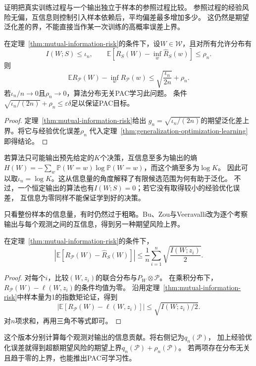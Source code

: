 证明把真实训练过程与一个输出独立于样本的参照过程比较。
参照过程的经验风险无偏，互信息则控制引入样本依赖后，平均偏差最多增加多少。
这仍然是期望泛化差的界，不能直接当作某一次训练的高概率误差上界。

\begin{theorem}[互信息稳定性与可学习性]
\label{thm:mutual-information-learning}
在定理~\ref{thm:mutual-information-risk}的条件下，设$W\in\mathcal W$，且对所有允许分布有
\[
 I(W;S)\leq\iota_n,\qquad
 \mathbb E[\hat R_S(W)-\inf_w\hat R_S(w)]\leq\rho_n.
\]
则
\[
 \mathbb E R_{\mathcal P}(W)-\inf_wR_{\mathcal P}(w)
 \leq\sqrt{\frac{\iota_n}{2n}}+\rho_n.
\]
若$\iota_n/n\to0$且$\rho_n\to0$，算法分布无关PAC学习此问题。
条件$\sqrt{\iota_n/(2n)}+\rho_n\leq\varepsilon\delta$足以保证PAC目标。
\end{theorem}
\begin{proof}
定理~\ref{thm:mutual-information-risk}给出
$g_n=\sqrt{\iota_n/(2n)}$的期望泛化差上界。将它与经验优化误差$\rho_n$
代入定理~\ref{thm:generalization-optimization-learning}即得结论。
\end{proof}

若算法只可能输出预先给定的$K$个决策，互信息至多为输出的熵
$H(W)=-\sum_w\mathbb P(W=w)\log\mathbb P(W=w)$，而这个熵至多为$\log K$。
因此可以取$\iota_n=\log K$。这从信息量的角度解释了有限候选范围为何有助于泛化。
不过，一个恒定输出的算法也有$I(W;S)=0$；若它没有取得较小的经验优化误差，
互信息为零同样不能保证学到好的决策。

只看整份样本的信息量，有时仍然过于粗略。Bu、Zou与Veeravalli改为逐个考察
输出与每个观测之间的互信息，得到另一种期望风险上界。

\begin{theorem}[逐观测互信息的期望风险界]
\label{thm:individual-information-risk}
在定理~\ref{thm:mutual-information-risk}的条件下，
\[
 \left|\mathbb E[R_{\mathcal P}(W)-\hat R_S(W)]\right|
 \leq\frac1n\sum_{i=1}^n\sqrt{\frac{I(W;z_i)}2}.
\]
\end{theorem}
\begin{proof}
对每个$i$，比较$(W,z_i)$的联合分布与$P_W\otimes\mathcal P$。
在乘积分布下，$R_{\mathcal P}(W)-\ell(W,z_i)$的条件均值为零。
沿用定理~\ref{thm:mutual-information-risk}中样本量为1的指数矩论证，得到
\[
 \left|\mathbb E[R_{\mathcal P}(W)-\ell(W,z_i)]\right|
 \leq\sqrt{I(W;z_i)/2}.
\]
对$n$项求和，再用三角不等式即可。
\end{proof}

这个版本分别计算每个观测对输出的信息贡献。将右侧记为$q_n(\mathcal P)$，
加上经验优化误差就得到超额期望风险的期望上界$q_n(\mathcal P)+\rho_n(\mathcal P)$。
若两项存在分布无关且趋于零的上界，也能推出PAC可学习性。

